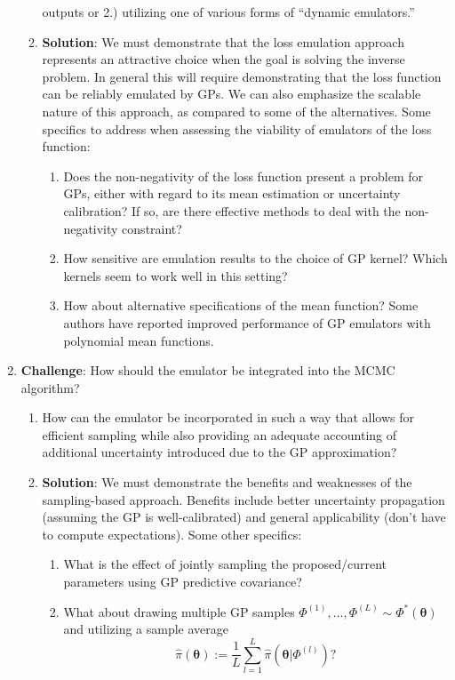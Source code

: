 \documentclass[12pt]{article}
\newcommand{\btheta}{\boldsymbol{\theta}}
\begin{document}
\begin{enumerate}
\begin{enumerate}
	outputs or 2.) utilizing one of various forms of ``dynamic emulators.''
	\item \textbf{Solution}: We must demonstrate that the loss emulation approach represents an attractive choice when the goal is solving the inverse problem. In general this will require demonstrating that
	the loss function can be reliably emulated by GPs. We can also emphasize the scalable nature of this approach, as compared to some of the alternatives. Some specifics to address when assessing the viability of emulators of the loss function: 
		\begin{enumerate} 
		\item Does the non-negativity of the loss function present a problem for GPs, either with regard to its mean estimation or uncertainty calibration? If so, are there effective methods to deal with the non-negativity constraint? 
		\item How sensitive are emulation results to the choice of GP kernel? Which kernels seem to work well in this setting? 
		\item How about alternative specifications of the mean function? Some authors have reported improved performance of GP emulators with polynomial mean functions. 
		\end{enumerate}
	\end{enumerate}
\item \textbf{Challenge}: How should the emulator be integrated into the MCMC algorithm? 
	\begin{enumerate}
	\item How can the emulator be incorporated in such a way that allows for efficient sampling while also providing an adequate accounting of additional uncertainty introduced due to the GP 
	approximation? 
	\item \textbf{Solution}: We must demonstrate the benefits and weaknesses of the sampling-based approach. Benefits include better uncertainty propagation (assuming the GP is well-calibrated) 
	and general applicability (don't have to compute expectations). Some other specifics: 
		\begin{enumerate} 
		\item What is the effect of jointly sampling the proposed/current parameters using GP predictive covariance?
		\item What about drawing multiple GP samples $\Phi^{(1)}, \dots, \Phi^{(L)} \sim \Phi^*(\btheta)$ and utilizing a sample average
		\[\hat{\pi}(\btheta) := \frac{1}{L} \sum_{l = 1}^{L} \hat{\pi}\left(\btheta|\Phi^{(l)}\right)? \]

\end{enumerate}
\end{enumerate}
\end{enumerate}
\end{document}
